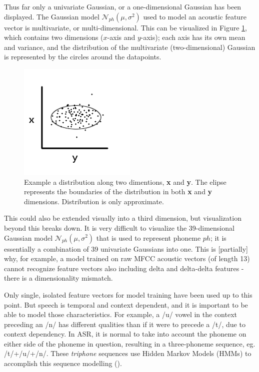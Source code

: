 Thus far only a univariate Gaussian, or a one-dimensional Gaussian has been displayed.  The Gaussian model $\mathcal{N}_{ph}(\mu,\sigma^2)$ used to model an acoustic feature vector is multivariate, or multi-dimensional.  This can be visualized in Figure \ref{fig:two-dim-gauss}, which contains two dimensions ($x$-axis and $y$-axis); each axis has its own mean and variance, and the distribution of the multivariate (two-dimensional) Gaussian is represented by the circles around the datapoints.  
\begin{figure}
\includegraphics[width=0.5\textwidth]{figure/two-dim-gauss.png}
\caption{Example a distribution along two dimentions, \textbf{x} and \textbf{y}.  The elipse represents the boundaries of the distribution in both \textbf{x} and \textbf{y} dimensions. Distribution is only approximate.}\label{fig:two-dim-gauss}
\end{figure}
This could also be extended visually into a third dimension, but visualization beyond this breaks down.  It is very difficult to visualize the 39-dimensional Gaussian model $\mathcal{N}_{ph}(\mu,\sigma^2)$ that is used to represent phoneme $ph$; it is essentially a combination of 39 univariate Gaussians into one.
This is [partially] why, for example, a model trained on raw MFCC acoustic vectors (of length 13) cannot recognize feature vectors also including delta and delta-delta features - there is a dimensionality mismatch.


Only single, isolated feature vectors for model training have been used up to this point.  But speech is temporal and context dependent, and it is important to be able to model those characteristics.  For example, a /u/ vowel in the context preceding an /n/ has different qualities than if it were to precede a /t/, due to context dependency.  In ASR, it is normal to take into account the phoneme on either side of the phoneme in question, resulting in a three-phoneme sequence, eg. /t/+/u/+/n/.  These \textit{triphone} sequences use Hidden Markov Models (HMMs) to accomplish this sequence modelling (\cite{jurafsky:09}).


